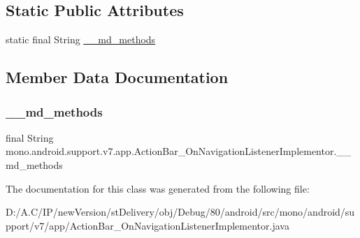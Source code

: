 \subsection*{Static Public Attributes}
\begin{DoxyCompactItemize}
\item 
static final String \hyperlink{classmono_1_1android_1_1support_1_1v7_1_1app_1_1_action_bar___on_navigation_listener_implementor_ace41bbd5e877c139f623cae4ca078214}{\+\_\+\+\_\+md\+\_\+methods}
\end{DoxyCompactItemize}


\subsection{Member Data Documentation}
\mbox{\label{classmono_1_1android_1_1support_1_1v7_1_1app_1_1_action_bar___on_navigation_listener_implementor_ace41bbd5e877c139f623cae4ca078214}} 
\subsubsection{\texorpdfstring{\+\_\+\+\_\+md\+\_\+methods}{\_\_md\_methods}}
{\footnotesize\ttfamily final String mono.\+android.\+support.\+v7.\+app.\+Action\+Bar\+\_\+\+On\+Navigation\+Listener\+Implementor.\+\_\+\+\_\+md\+\_\+methods\hspace{0.3cm}{\ttfamily [static]}}



The documentation for this class was generated from the following file\+:\begin{DoxyCompactItemize}
\item 
D\+:/\+A.\+C/\+I\+P/new\+Version/st\+Delivery/obj/\+Debug/80/android/src/mono/android/support/v7/app/Action\+Bar\+\_\+\+On\+Navigation\+Listener\+Implementor.\+java\end{DoxyCompactItemize}
